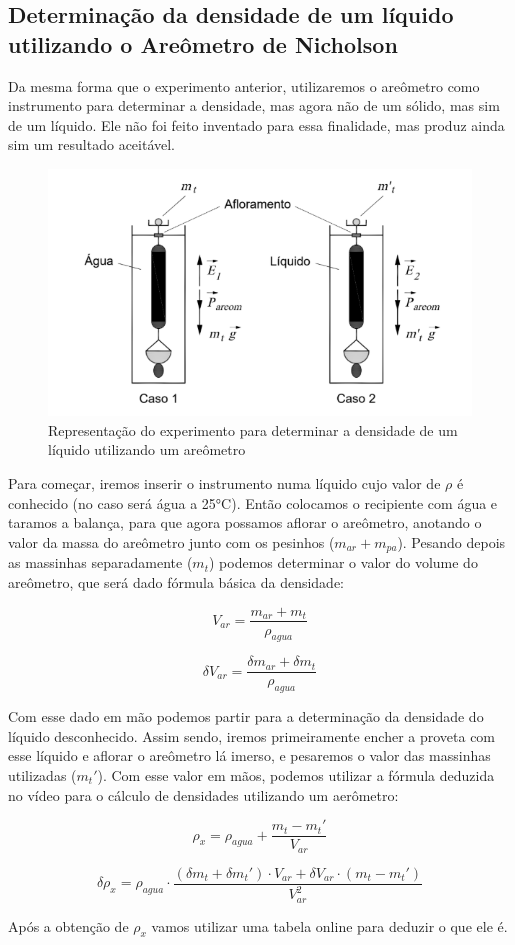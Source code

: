 \subsection{Determinação da densidade de um líquido utilizando o
Areômetro de Nicholson}

Da mesma forma que o experimento anterior, utilizaremos o areômetro como instrumento para determinar a densidade, mas agora não de um sólido, mas sim de um líquido. Ele não foi feito inventado para essa finalidade, mas produz ainda sim um resultado aceitável.

\begin{figure}[H]
    \centering
    \includegraphics[scale=0.8]{images/aerometro-densidade-liquido.png}
    \caption{Representação do experimento para determinar a densidade de um líquido utilizando um areômetro}
\end{figure}

Para começar, iremos inserir o instrumento numa líquido cujo valor de $\rho$ é conhecido (no caso será água a 25°C). Então colocamos o recipiente com água e taramos a balança, para que agora possamos aflorar o areômetro, anotando o valor da massa do areômetro junto com os pesinhos ($m_{ar} + m_{pa}$). Pesando depois as massinhas separadamente ($m_t$) podemos determinar o valor do volume do areômetro, que será dado fórmula básica da densidade:

\[ V_{ar} = \frac{m_{ar} + m_t}{\rho _{agua}} \]

\[ \delta V_{ar} = \frac{\delta m_{ar} + \delta m_t}{\rho _{agua}} \]

Com esse dado em mão podemos partir para a determinação da densidade do líquido desconhecido. Assim sendo, iremos primeiramente encher a proveta com esse líquido e aflorar o areômetro lá imerso, e pesaremos o valor das massinhas utilizadas ($m_t'$). Com esse valor em mãos, podemos utilizar a fórmula deduzida no vídeo para o cálculo de densidades utilizando um aerômetro:

\[ \rho _x = \rho _{agua} + \frac{m_t - m_t'}{V_{ar}} \]

\[ \delta \rho _x = \rho _{agua} \cdot \frac{(\delta m_t + \delta m_t') \cdot V_{ar} + \delta V_{ar} \cdot (m_t - m_t')}{V_{ar}^2} \]

Após a obtenção de $\rho _x$ vamos utilizar uma tabela online para deduzir o que ele é.
